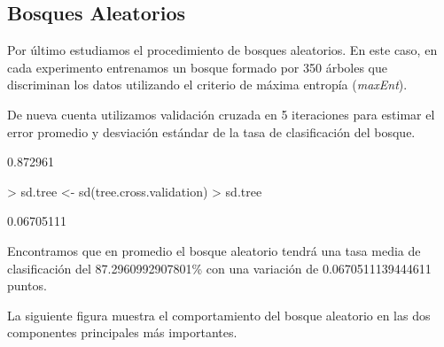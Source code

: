 \documentclass{article}
\begin{document}
\subsection{Bosques Aleatorios}
Por último estudiamos el procedimiento de bosques aleatorios. En este caso, en cada experimento entrenamos un bosque formado por 350 árboles que discriminan los datos utilizando el criterio de máxima entropía (\emph{maxEnt}).

De nueva cuenta utilizamos validación cruzada en 5 iteraciones para estimar el error promedio y desviación estándar de la tasa de clasificación del bosque.

\begin{Schunk}
\begin{Soutput}
[1] 0.872961
\end{Soutput}
\begin{Sinput}
> sd.tree <- sd(tree.cross.validation)
> sd.tree
\end{Sinput}
\begin{Soutput}
[1] 0.06705111
\end{Soutput}
\end{Schunk}

Encontramos que en promedio el bosque aleatorio tendrá una tasa media de clasificación del 87.2960992907801\% con una variación de 0.0670511139444611 puntos.

La siguiente figura muestra el comportamiento del bosque aleatorio en las dos componentes principales más importantes.
\end{document}
